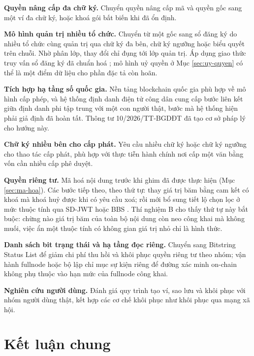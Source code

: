 \textbf{Quyền nâng cấp đa chữ ký.} Chuyển quyền nâng cấp mã và quyền gốc sang một ví đa chữ ký, hoặc khoá gói bất biến khi đã ổn định.

\textbf{Mô hình quản trị nhiều tổ chức.} Chuyển từ một gốc sang sổ đăng ký do nhiều tổ chức cùng quản trị qua chữ ký đa bên, chữ ký ngưỡng hoặc biểu quyết trên chuỗi. Nhờ phân lớp, thay đổi chỉ đụng tới lớp quản trị. Áp dụng giao thức truy vấn sổ đăng ký đã chuẩn hoá \cite{ToIP_TRQP2026}; mô hình uỷ quyền ở Mục \ref{sec:uy-quyen} có thể là một điểm dữ liệu cho phần đặc tả còn hoãn.

\textbf{Tích hợp hạ tầng số quốc gia.} Nền tảng blockchain quốc gia \cite{NDAChain2025} phù hợp về mô hình cấp phép, và hệ thống định danh điện tử công dân cung cấp bước liên kết giữa định danh phi tập trung với một con người thật, bước mà hệ thống hiện phải giả định đã hoàn tất. Thông tư 10/2026/TT-BGDĐT \cite{TT10_2026} đã tạo cơ sở pháp lý cho hướng này.

\textbf{Chữ ký nhiều bên cho cấp phát.} Yêu cầu nhiều chữ ký hoặc chữ ký ngưỡng cho thao tác cấp phát, phù hợp với thực tiễn hành chính nơi cấp một văn bằng vốn cần nhiều cấp phê duyệt.

\textbf{Quyền riêng tư.} Mã hoá nội dung trước khi ghim đã được thực hiện (Mục \ref{sec:ma-hoa}). Các bước tiếp theo, theo thứ tự: thay giá trị băm bằng cam kết có khoá mà khoá huỷ được khi có yêu cầu xoá; rồi mới bổ sung tiết lộ chọn lọc ở mức thuộc tính qua SD-JWT \cite{RFC9901} hoặc BBS \cite{Looker_BBS2025}. Thí nghiệm B cho thấy thứ tự này bắt buộc: chừng nào giá trị băm của toàn bộ nội dung còn neo công khai mà không muối, việc ẩn một thuộc tính có không gian giá trị nhỏ chỉ là hình thức.

\textbf{Danh sách bit trạng thái và hạ tầng đọc riêng.} Chuyển sang Bitstring Status List để giảm chi phí thu hồi và khôi phục quyền riêng tư theo nhóm; vận hành fullnode hoặc bộ lập chỉ mục sự kiện riêng để đường xác minh on-chain không phụ thuộc vào hạn mức của fullnode công khai.

\textbf{Nghiên cứu người dùng.} Đánh giá quy trình tạo ví, sao lưu và khôi phục với nhóm người dùng thật, kết hợp các cơ chế khôi phục như khôi phục qua mạng xã hội.

\section{Kết luận chung}

